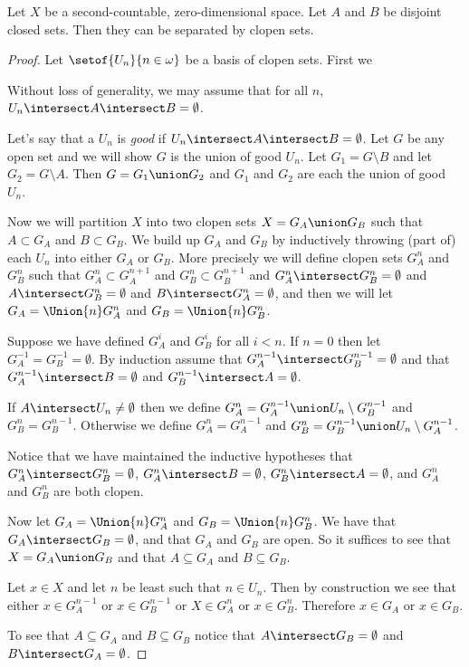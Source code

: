 \documentclass[oneside,12pt]{amsart}
\begin{document}
\begin{lemma} Let $X$ be a second-countable, zero-dimensional space.
Let $A$ and $B$ be disjoint closed sets. Then they can be separated by clopen sets.
\end{lemma}
\begin{proof}
Let $\setof{U_n}{n\in\omega}$ be a basis of clopen sets. First we

\begin{claim}
Without loss of generality, we may assume that for all $n$, $U_n\intersect A \intersect B = \emptyset$.
\end{claim}

\begin{subproof}
Let's say that a $U_n$ is \emph{good} if $U_n\intersect A \intersect B = \emptyset$.
Let $G$ be any open set and we will show $G$ is the union of good $U_n$. Let
$G_1 = G\setminus B$ and let $G_2 = G\setminus A$. Then $G=G_1\union G_2$ and $G_1$ and $G_2$ are each the union of
good $U_n$.
\end{subproof}

Now we will partition $X$ into two clopen sets $X=G_A \union G_B$ such that $A\subset G_A$ and $B \subset G_B$.
We build up $G_A$ and $G_B$ by inductively throwing (part of) each $U_n$ into either $G_A$ or $G_B$. More
precisely we will define clopen sets $G^n_A$ and $G^n_B$ such that $G^n_A \subset G^{n+1}_A$ and
$G^n_B \subset G^{n+1}_B$ and $G^n_A \intersect G^n_B = \emptyset$ and $A\intersect G^n_B = \emptyset$
and $B\intersect G^n_A = \emptyset$, and then we will let
$G_A = \Union{n} G^n_A$ and $G_B = \Union{n} G^n_B$.

Suppose we have defined
$G^i_A$ and $G^i_B$ for all $i < n$. If $n=0$ then let $G^{-1}_A=G^{-1}_B=\emptyset$.
By induction assume that $G^{n-1}_A \intersect G^{n-1}_B = \emptyset$ and that
$G^{n-1}_A\intersect B = \emptyset$ and $G^{n-1}_B\intersect A = \emptyset$.

If $A\intersect U_n \not= \emptyset$ then we define
$G^n_A = G^{n-1}_A \union U_n \setminus G^{n-1}_B$ and $G^n_B = G^{n-1}_B$. Otherwise we define
$G^n_A = G^{n-1}_A$ and $G^n_B = G^{n-1}_B \union U_n \setminus G^{n-1}_A$.

Notice that we have maintained the inductive hypotheses that $G^n_A\intersect G^n_B = \emptyset$,
$G^n_A\intersect B = \emptyset$, $G^n_B\intersect A = \emptyset$, and $G^n_A$ and $G^n_B$ are
both clopen.

Now let $G_A = \Union{n} G^n_A$ and $G_B = \Union{n} G^n_B$. We have that $G_A\intersect G_B = \emptyset$,
and that $G_A$ and $G_B$ are open. So it suffices to see that $X = G_A \union G_B$ and that
$A \subseteq G_A$ and $B \subseteq G_B$.

Let $x \in X$ and let $n$ be least such that $n \in U_n$. Then by construction we see that
either $x \in G^{n-1}_A$ or $x \in G^{n-1}_B$ or $X \in G^n_A$ or $x \in G^n_B$. Therefore
$x \in G_A$ or $x \in G_B$.

To see that $A\subseteq G_A$ and $B\subseteq G_B$ notice that $A\intersect G_B = \emptyset$
and $B\intersect G_A = \emptyset$.

\end{proof}





\end{document}
